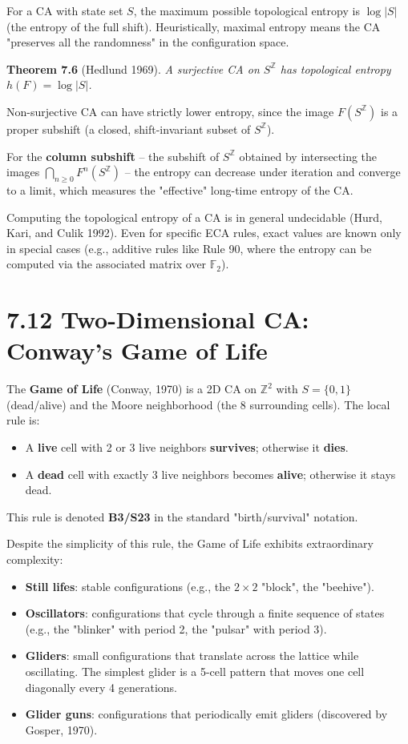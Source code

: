 For a CA with state set $S$, the maximum possible topological entropy is $\log |S|$ (the entropy of the full shift). Heuristically, maximal entropy means the CA "preserves all the randomness" in the configuration space.

\textbf{Theorem 7.6} (Hedlund 1969). \textit{A surjective CA on $S^{\mathbb{Z}}$ has topological entropy $h(F) = \log |S|$.}

Non-surjective CA can have strictly lower entropy, since the image $F(S^{\mathbb{Z}})$ is a proper subshift (a closed, shift-invariant subset of $S^{\mathbb{Z}}$).

For the \textbf{column subshift} -- the subshift of $S^{\mathbb{Z}}$ obtained by intersecting the images $\bigcap_{n \geq 0} F^n(S^{\mathbb{Z}})$ -- the entropy can decrease under iteration and converge to a limit, which measures the "effective" long-time entropy of the CA.

Computing the topological entropy of a CA is in general undecidable (Hurd, Kari, and Culik 1992). Even for specific ECA rules, exact values are known only in special cases (e.g., additive rules like Rule 90, where the entropy can be computed via the associated matrix over $\mathbb{F}_2$).


\section{7.12 Two-Dimensional CA: Conway's Game of Life}

The \textbf{Game of Life} (Conway, 1970) is a 2D CA on $\mathbb{Z}^2$ with $S = \{ 0, 1\} $ (dead/alive) and the Moore neighborhood (the 8 surrounding cells). The local rule is:

\begin{itemize}
  \item A \textbf{live} cell with 2 or 3 live neighbors \textbf{survives}; otherwise it \textbf{dies}.
  \item A \textbf{dead} cell with exactly 3 live neighbors becomes \textbf{alive}; otherwise it stays dead.
\end{itemize}

This rule is denoted \textbf{B3/S23} in the standard "birth/survival" notation.

Despite the simplicity of this rule, the Game of Life exhibits extraordinary complexity:

\begin{itemize}
  \item \textbf{Still lifes}: stable configurations (e.g., the $2 \times 2$ "block", the "beehive").
  \item \textbf{Oscillators}: configurations that cycle through a finite sequence of states (e.g., the "blinker" with period 2, the "pulsar" with period 3).
  \item \textbf{Gliders}: small configurations that translate across the lattice while oscillating. The simplest glider is a 5-cell pattern that moves one cell diagonally every 4 generations.
  \item \textbf{Glider guns}: configurations that periodically emit gliders (discovered by Gosper, 1970).
\end{itemize}

